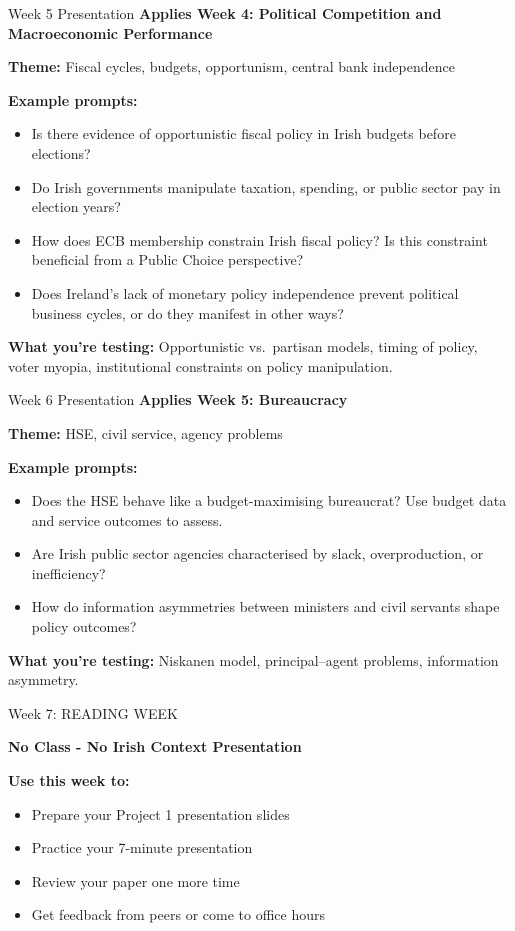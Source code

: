 \documentclass[10pt]{beamer}
\begin{document}
\begin{frame}{Week 5 Presentation}
\textbf{Applies Week 4: Political Competition and Macroeconomic Performance}

\textbf{Theme:} Fiscal cycles, budgets, opportunism, central bank independence

\textbf{Example prompts:}
\begin{itemize}
\item Is there evidence of opportunistic fiscal policy in Irish budgets before elections?
\item Do Irish governments manipulate taxation, spending, or public sector pay in election years?
\item How does ECB membership constrain Irish fiscal policy? Is this constraint beneficial from a Public Choice perspective?
\item Does Ireland's lack of monetary policy independence prevent political business cycles, or do they manifest in other ways?
\end{itemize}

\textbf{What you're testing:} Opportunistic vs.\ partisan models, timing of policy, voter myopia, institutional constraints on policy manipulation.
\end{frame}

\begin{frame}{Week 6 Presentation}
\textbf{Applies Week 5: Bureaucracy}

\textbf{Theme:} HSE, civil service, agency problems

\textbf{Example prompts:}
\begin{itemize}
\item Does the HSE behave like a budget-maximising bureaucrat? Use budget data and service outcomes to assess.
\item Are Irish public sector agencies characterised by slack, overproduction, or inefficiency?
\item How do information asymmetries between ministers and civil servants shape policy outcomes?
\end{itemize}

\textbf{What you're testing:} Niskanen model, principal--agent problems, information asymmetry.
\end{frame}

\begin{frame}{Week 7: READING WEEK}
\begin{center}
\Large \textbf{No Class - No Irish Context Presentation}

\vspace{1cm}

\textbf{Use this week to:}
\begin{itemize}
\item Prepare your Project 1 presentation slides
\item Practice your 7-minute presentation
\item Review your paper one more time
\item Get feedback from peers or come to office hours
\end{itemize}
\end{center}
\end{frame}
\end{document}

